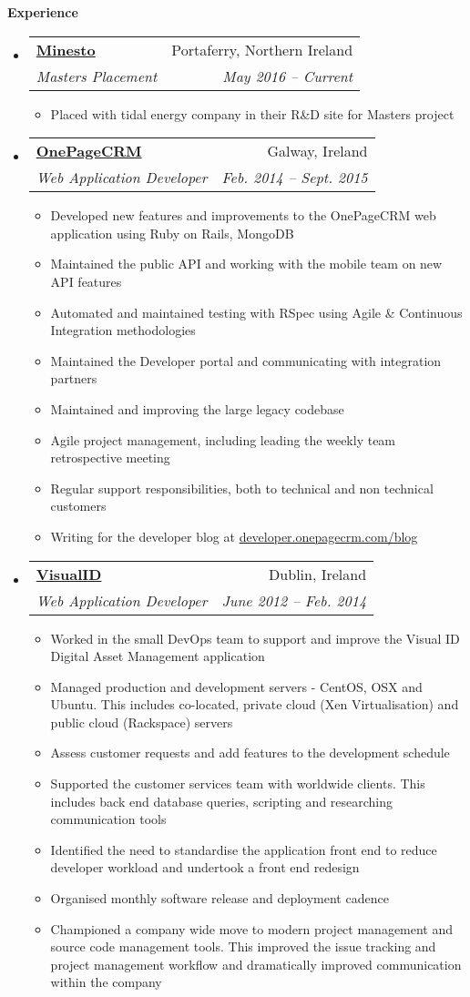 \documentclass[letterpaper,11pt]{article}
\makeatletter
\newcommand{\resitem}[1]{\item #1 \vspace{-2pt}}
\newcommand{\resheading}[1]{{\large \colorbox{mygrey}{\begin{minipage}{\textwidth}{\textbf{#1 \vphantom{p\^{E}}}}\end{minipage}}}}
\newcommand{\ressubheading}[4]{
\begin{tabular*}{6.5in}{l@{\extracolsep{\fill}}r}
		\textbf{#1} & #2 \\
		\textit{#3} & \textit{#4} \\
\end{tabular*}\vspace{-6pt}}
\makeatother
\begin{document}
\resheading{Experience}
  \begin{itemize}
      \item 
      \ressubheading{\href{http://www.minesto.com}{Minesto}}{Portaferry, Northern Ireland}
        {Masters Placement}{May 2016 -- Current}
        { \footnotesize
        \begin{itemize}
          \resitem{Placed with tidal energy company in their R\&D site for Masters project}
        \end{itemize}
        }

      \item 
      \ressubheading{\href{http://www.onepagecrm.com}{OnePageCRM}}{Galway, Ireland}
        {Web Application Developer}{Feb. 2014 -- Sept. 2015}
        { \footnotesize
        \begin{itemize}
          \resitem{Developed new features and improvements to the OnePageCRM web application using Ruby on Rails, MongoDB}
          \resitem{Maintained the public API and working with the mobile team on new API features}
          \resitem{Automated and maintained testing with RSpec using Agile \& Continuous Integration methodologies}
          \resitem{Maintained the Developer portal and communicating with integration partners}
          \resitem{Maintained and improving the large legacy codebase}
          \resitem{Agile project management, including leading the weekly team retrospective meeting}
          \resitem{Regular support responsibilities, both to technical and non technical customers}
          \resitem{Writing for the developer blog at \href{http://developer.onepagecrm.com/blog}{developer.onepagecrm.com/blog}}
        \end{itemize}
        }

      \item 
      \ressubheading{\href{http://visualid.com}{VisualID}}{Dublin, Ireland}{Web Application Developer}{June 2012 -- Feb. 2014}
        { \footnotesize
        \begin{itemize}
          \resitem{Worked in the small DevOps team to support and improve the Visual ID Digital Asset Management application}
          \resitem{Managed production and development servers - CentOS, OSX and Ubuntu. This includes co-located, private cloud (Xen Virtualisation) and public cloud (Rackspace) servers}
          \resitem{Assess customer requests and add features to the development schedule}
          \resitem{Supported the customer services team with worldwide clients. This includes back end database queries, scripting and researching communication tools}
          \resitem{Identified the need to standardise the application front end to reduce developer workload and undertook a front end redesign}
          \resitem{Organised monthly software release and deployment cadence}
          \resitem{Championed a company wide move to modern project management and source code management tools. This improved the issue tracking and project management workflow and dramatically improved communication within the company}
        \end{itemize}
        }
        

\end{itemize}
\end{document}
